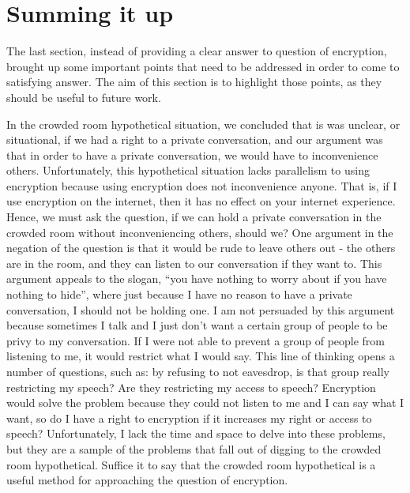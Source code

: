 \documentclass[11pt]{article}
\begin{document}
\section{Summing it up}
The last section, instead of providing a clear answer to question of encryption, brought up some important points that need to be addressed in order to come to satisfying answer.
The aim of this section is to highlight those points, as they should be useful to future work.

In the crowded room hypothetical situation, we concluded that is was unclear, or situational, if we had a right to a private conversation, and our argument was that in order to have a private conversation, we would have to inconvenience others.
Unfortunately, this hypothetical situation lacks parallelism to using encryption because using encryption does not inconvenience anyone. 
That is, if I use encryption on the internet, then it has no effect on your internet experience.
Hence, we must ask the question, if we can hold a private conversation in the crowded room without inconveniencing others, should we?
One argument in the negation of the question is that it would be rude to leave others out - the others are in the room, and they can listen to our conversation if they want to.
This argument appeals to the slogan, ``you have nothing to worry about if you have nothing to hide'', where just because I have no reason to have a private conversation, I should not be holding one.
I am not persuaded by this argument because sometimes I talk and I just don't want a certain group of people to be privy to my conversation.
If I were not able to prevent a group of people from listening to me, it would restrict what I would say.
This line of thinking opens a number of questions, such as: by refusing to not eavesdrop, is that group really restricting my speech? Are they restricting my access to speech? 
Encryption would solve the problem because they could not listen to me and I can say what I want, so do I have a right to encryption if it increases my right or access to speech?
Unfortunately, I lack the time and space to delve into these problems, but they are a sample of the problems that fall out of digging to the crowded room hypothetical.
Suffice it to say that the crowded room hypothetical is a useful method for approaching the question of encryption.
\end{document}
